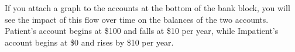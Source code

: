 If you attach a graph to the accounts at the bottom of the bank block,
you will see the impact of this flow over time on the balances of
the two accounts. Patient's account begins at \$100 and falls at \$10
per year, while Impatient's account begins at \$0 and rises by \$10
per year.
\begin{center}
\par\end{center}

